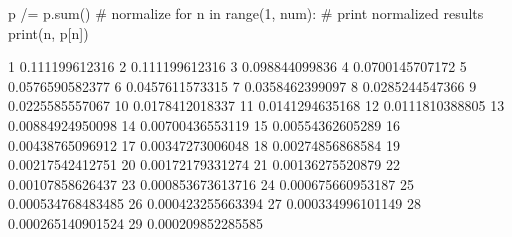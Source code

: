 
p /= p.sum()  # normalize
for n in range(1, num):  # print normalized results
    print(n, p[n])

1 0.111199612316
2 0.111199612316
3 0.098844099836
4 0.0700145707172
5 0.0576590582377
6 0.0457611573315
7 0.0358462399097
8 0.0285244547366
9 0.0225585557067
10 0.0178412018337
11 0.0141294635168
12 0.0111810388805
13 0.00884924950098
14 0.00700436553119
15 0.00554362605289
16 0.00438765096912
17 0.00347273006048
18 0.00274856868584
19 0.00217542412751
20 0.00172179331274
21 0.00136275520879
22 0.00107858626437
23 0.000853673613716
24 0.000675660953187
25 0.000534768483485
26 0.000423255663394
27 0.000334996101149
28 0.000265140901524
29 0.000209852285585
